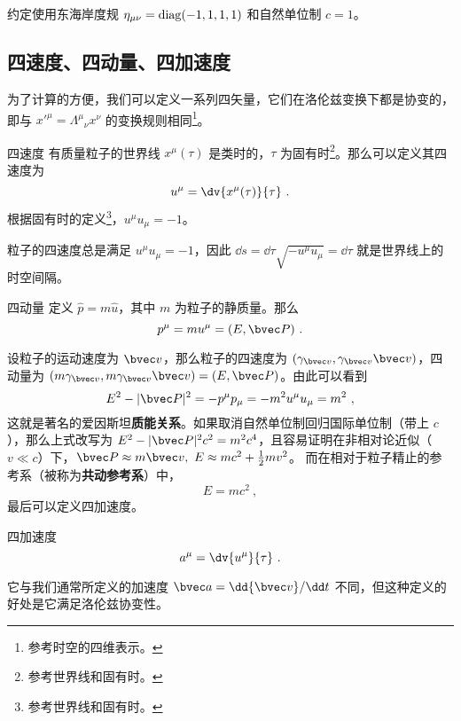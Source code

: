 

约定使用东海岸度规 $\eta_{\mu\nu}=\rm{diag}(-1,1,1,1)$ 和自然单位制 $c=1$。

\subsection{四速度、四动量、四加速度}
为了计算的方便，我们可以定义一系列四矢量，它们在洛伦兹变换下都是协变的，即与 $x'^\mu=\Lambda^\mu{}_\nu x^\nu$ 的变换规则相同\footnote{参考时空的四维表示。}。

\begin{definition}{四速度}
有质量粒子的世界线 $x^\mu(\tau)$ 是类时的，$\tau$ 为固有时\footnote{参考世界线和固有时。}。那么可以定义其四速度为
\begin{equation}
u^\mu = \dv{x^\mu(\tau)}{\tau}~.
\end{equation}
根据固有时的定义\footnote{参考世界线和固有时。}，$u^\mu u_\mu = -1$。
\end{definition}
粒子的四速度总是满足 $u^\mu u_\mu = -1$，因此 $\dd s = \dd \tau \sqrt{- u^\mu u_\mu} = \dd \tau$ 就是世界线上的时空间隔。

\begin{definition}{四动量}
定义 $\hat p=m\hat u$，其中 $m$ 为粒子的静质量。那么
\begin{equation}
p^\mu = m u^\mu = (E,\bvec P)~.
\end{equation}
\end{definition}
设粒子的运动速度为 $\bvec v$，那么粒子的四速度为 $(\gamma_{\bvec v},\gamma_{\bvec v}\bvec v)$，四动量为 $(m\gamma_{\bvec v}, m\gamma_{\bvec v} \bvec v)=(E,\bvec P)$。由此可以看到
\begin{equation}
E^2-|\bvec P|^2=-p^\mu p_\mu=-m^2 u^\mu u_\mu = m^2~,
\end{equation}
这就是著名的爱因斯坦\textbf{质能关系}。如果取消自然单位制回归国际单位制（带上 $c$），那么上式改写为 $E^2-|\bvec P|^2c^2=m^2c^4$，且容易证明在非相对论近似（$v\ll c$）下，$\bvec P\approx m\bvec v,\ E\approx mc^2+\frac{1}{2}mv^2$。
而在相对于粒子精止的参考系（被称为\textbf{共动参考系}）中，
\begin{equation}
E=mc^2~,
\end{equation}
最后可以定义四加速度。
\begin{definition}{四加速度}
\begin{equation}
a^\mu = \dv{u^\mu}{\tau}~.
\end{equation}
\end{definition}
它与我们通常所定义的加速度 $\bvec a=\dd {\bvec v}/\dd t$ 不同，但这种定义的好处是它满足洛伦兹协变性。